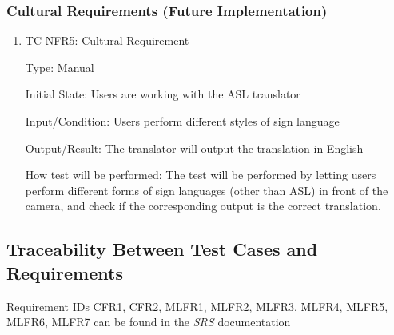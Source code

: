 \documentclass[12pt]{article}
\begin{document}
\subsubsection{Cultural Requirements (Future Implementation)}

\begin{enumerate}

\item{TC-NFR5: Cultural Requirement\\}

Type: Manual

Initial State: Users are working with the ASL translator
					
Input/Condition: Users perform different styles of sign language 
					
Output/Result: The translator will output the translation in English
					
How test will be performed: The test will be performed by letting users perform different forms of sign languages (other than ASL) in front of the camera, and check if the corresponding output is the correct translation.

\end{enumerate}

\newpage

\subsection{Traceability Between Test Cases and Requirements}

Requirement IDs CFR1, CFR2, MLFR1, MLFR2, MLFR3, MLFR4, MLFR5, MLFR6, MLFR7 can be found in the \emph{SRS} \citep{SRS} documentation\\
~\\
\end{document}
